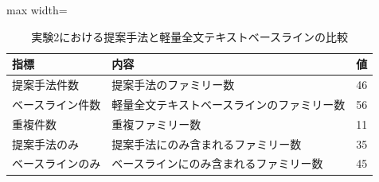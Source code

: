 \begin{table}[tbp]
\centering
\small
\caption{実験2における提案手法と軽量全文テキストベースラインの比較}
\label{tab:experiment2_fulltext_baseline_table}
\begin{adjustbox}{max width=\textwidth}
\begin{tabular}{lll}
\toprule
指標 & 内容 & 値 \\
\midrule
提案手法件数 & 提案手法のファミリー数 & 46 \\
ベースライン件数 & 軽量全文テキストベースラインのファミリー数 & 56 \\
重複件数 & 重複ファミリー数 & 11 \\
提案手法のみ & 提案手法にのみ含まれるファミリー数 & 35 \\
ベースラインのみ & ベースラインにのみ含まれるファミリー数 & 45 \\
\bottomrule
\end{tabular}
\end{adjustbox}
\end{table}
